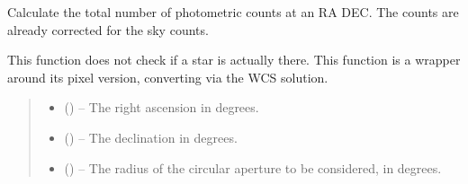 \documentclass[letterpaper,11pt,english]{sphinxmanual}
\begin{document}
\begin{savenotes}
\begin{fulllineitems}
\begin{savenotes}
\begin{fulllineitems}
\begin{quote}
\begin{description}
\end{description}\end{quote}

\end{fulllineitems}\end{savenotes}


\begin{savenotes}\begin{fulllineitems}
\label{\detokenize{code/opihiexarata.photometry.solution:opihiexarata.photometry.solution.PhotometricSolution._calculate_star_photon_counts_coordinate}}
\pysigstartsignatures
{}
\pysigstopsignatures
\sphinxAtStartPar
Calculate the total number of photometric counts at an RA DEC. The
counts are already corrected for the sky counts.

\sphinxAtStartPar
This function does not check if a star is actually there. This function
is a wrapper around its pixel version, converting via the WCS solution.
\begin{quote}\begin{description}
\begin{itemize}
\item {} 
\sphinxAtStartPar
{} () – The right ascension in degrees.

\item {} 
\sphinxAtStartPar
{} () – The declination in degrees.

\item {} 
\sphinxAtStartPar
{} () – The radius of the circular aperture to be considered, in degrees.

\end{itemize}


\end{description}
\end{quote}
\end{fulllineitems}
\end{savenotes}
\end{fulllineitems}
\end{savenotes}
\end{document}
